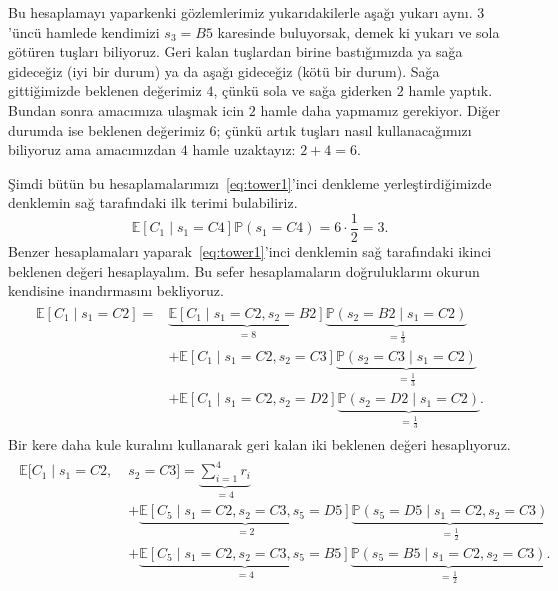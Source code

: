 %
Bu hesaplamay{\i} yaparkenki g\"{o}zlemlerimiz yukar{\i}dakilerle
a\c{s}a\u{g}{\i} yukar{\i} ayn{\i}. $3$'\"{u}nc\"{u} hamlede kendimizi $s_3 =
B5$ karesinde buluyorsak, demek ki yukar{\i} ve sola g\"{o}t\"{u}ren
tu\c{s}lar{\i} biliyoruz. Geri kalan tu\c{s}lardan birine
bast{\i}\u{g}{\i}m{\i}zda ya sa\u{g}a gidece\u{g}iz (iyi bir durum) ya da
a\c{s}a\u{g}{\i} gidece\u{g}iz (k\"{o}t\"{u} bir durum). Sa\u{g}a
gitti\u{g}imizde beklenen de\u{g}erimiz $4$, \c{c}\"{u}nk\"{u} sola ve sa\u{g}a
giderken $2$ hamle yapt{\i}k. Bundan sonra amac{\i}m{\i}za ula\c{s}mak icin $2$
hamle daha yapmam{\i}z gerekiyor. Di\u{g}er durumda ise beklenen de\u{g}erimiz
$6$; \c{c}\"{u}nk\"{u} art{\i}k tu\c{s}lar{\i} nas{\i}l
kullanaca\u{g}{\i}m{\i}z{\i} biliyoruz ama amac{\i}m{\i}zdan $4$ hamle
uzaktay{\i}z: $2+4 = 6$.

\c{S}imdi b\"{u}t\"{u}n bu hesaplamalar{\i}m{\i}z{\i}~\eqref{eq:tower1}'inci
denkleme yerle\c{s}tirdi\u{g}imizde denklemin sa\u{g} taraf{\i}ndaki ilk terimi
bulabiliriz.
%
\begin{equation}
    \mathbb{E}[C_1 \mid s_1=C4]\mathbb{P}(s_1=C4) = 6 \cdot \frac{1}{2} = 3.
    \label{eq:first_term}
\end{equation}
%
Benzer hesaplamalar{\i} yaparak~\eqref{eq:tower1}'inci denklemin sa\u{g}
taraf{\i}ndaki ikinci beklenen de\u{g}eri hesaplayal{\i}m. Bu sefer
hesaplamalar{\i}n do\u{g}ruluklar{\i}n{\i} okurun kendisine
inand{\i}rmas{\i}n{\i} bekliyoruz.
%
\begin{align}
    \begin{split}
    \mathbb{E}\left[ C_1 \mid s_1 = C2 \right] =
    &\underbrace{\mathbb{E}[C_1 \mid s_1 = C2, s_2 = B2]}_{=8} \underbrace{\mathbb{P}(s_2 = B2 \mid s_1 = C2)}_{=\frac{1}{3}} \\
    &+ \mathbb{E}[C_1 \mid s_1=C2, s_2 = C3] \underbrace{\mathbb{P}(s_2 = C3 \mid s_1 = C2)}_{=\frac{1}{3}} \\
    &+ \mathbb{E}[C_1 \mid s_1 = C2, s_2 = D2] \underbrace{\mathbb{P}(s_2 = D2 \mid s_1 = C2)}_{=\frac{1}{3}}.
    \end{split}
    \label{eq:tower3}
\end{align}
%
Bir kere daha kule kural{\i}n{\i} kullanarak geri kalan iki beklenen de\u{g}eri
hesapl{\i}yoruz.
%
\begin{align}
    \begin{split}
    \mathbb{E}[C_1 \mid s_1=C2, \; &s_2=C3] = \underbrace{\sum_{i=1}^4 r_i}_{=4} \\
    &+ \underbrace{\mathbb{E}[C_5 \mid s_1=C2, s_2=C3, s_5=D5]}_{=2} \underbrace{\mathbb{P}(s_5=D5 \mid s_1=C2, s_2=C3)}_{=\frac{1}{2}} \\
    &+ \underbrace{\mathbb{E}[C_5 \mid s_1=C2, s_2=C3, s_5=B5]}_{=4} \underbrace{\mathbb{P}(s_5=B5 \mid s_1=C2, s_2=C3)}_{=\frac{1}{2}}.
    \end{split}
\end{align}
